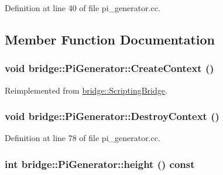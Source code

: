 Definition at line 40 of file pi\_\-generator.cc.



\subsection{Member Function Documentation}
\hypertarget{classbridge_1_1_pi_generator_aa5be4efa2d7fe286582ccec734619db4}{
\subsubsection[{CreateContext}]{\setlength{\rightskip}{0pt plus 5cm}void bridge::PiGenerator::CreateContext ()}}
\label{classbridge_1_1_pi_generator_aa5be4efa2d7fe286582ccec734619db4}


Reimplemented from \hyperlink{classbridge_1_1_scripting_bridge_a1ebec17acf6dfcd03462eee8fec9406e}{bridge::ScriptingBridge}.

\hypertarget{classbridge_1_1_pi_generator_ad0299e34e6e407bdb4b10dd6b26772e1}{
\subsubsection[{DestroyContext}]{\setlength{\rightskip}{0pt plus 5cm}void bridge::PiGenerator::DestroyContext ()}}
\label{classbridge_1_1_pi_generator_ad0299e34e6e407bdb4b10dd6b26772e1}


Definition at line 78 of file pi\_\-generator.cc.

\hypertarget{classbridge_1_1_pi_generator_a4f079f180ee84d53cab6df3f5baf7492}{
\subsubsection[{height}]{\setlength{\rightskip}{0pt plus 5cm}int bridge::PiGenerator::height () const}}
\label{classbridge_1_1_pi_generator_a4f079f180ee84d53cab6df3f5baf7492}


